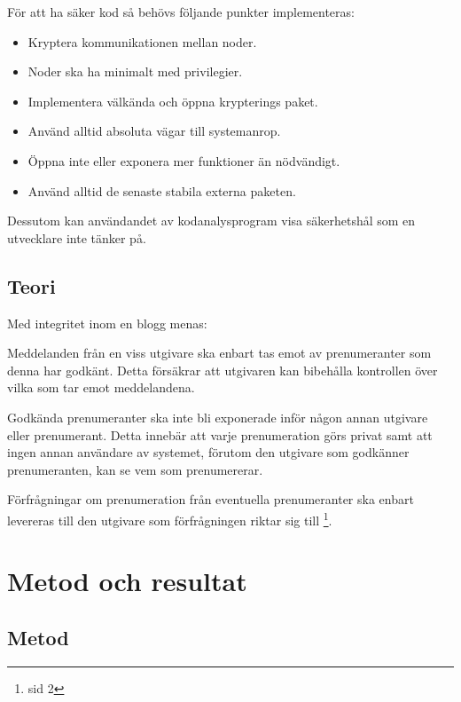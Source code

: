 \documentclass[12pt]{article}
\begin{document}
\begin{minipage}{\textwidth}
För att ha säker kod så behövs följande punkter implementeras:

\begin{itemize} 
		\item Kryptera kommunikationen mellan noder\footnotemark.
		\item Noder ska ha minimalt med privilegier.
		\item Implementera välkända och öppna krypterings paket.
		\item Använd alltid absoluta vägar till systemanrop.
		\item Öppna inte eller exponera mer funktioner än nödvändigt.
		\item Använd alltid de senaste stabila externa paketen.
	\end{itemize}
Dessutom kan användandet av kodanalysprogram visa säkerhetshål som en utvecklare inte tänker på\cite{101}.
\end{minipage}




\subsection{Teori}
Med integritet inom en blogg menas:

Meddelanden från en viss utgivare ska enbart tas emot av prenumeranter som denna har godkänt.
Detta försäkrar att utgivaren kan bibehålla kontrollen över vilka som tar emot meddelandena.

Godkända prenumeranter ska inte bli exponerade inför någon annan utgivare eller prenumerant.
Detta innebär att varje prenumeration görs privat samt att ingen annan användare av systemet, förutom den utgivare som godkänner prenumeranten, kan se vem som prenumererar.

Förfrågningar om prenumeration från eventuella prenumeranter ska enbart levereras till den utgivare som förfrågningen riktar sig till
\footnote{sid 2\cite{IFC}}.



\section{Metod och 	resultat }	



\subsection{ Metod}
\end{document}
